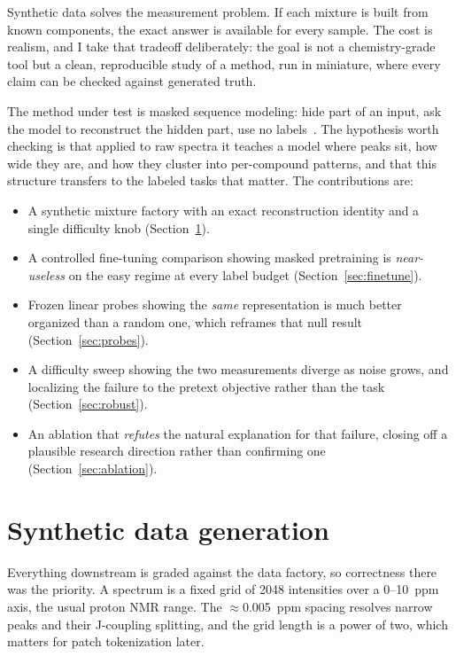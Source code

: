 \documentclass[11pt]{article}
\begin{document}
Synthetic data solves the measurement problem. If each mixture is built from known components,
the exact answer is available for every sample. The cost is realism, and I take that tradeoff
deliberately: the goal is not a chemistry-grade tool but a clean, reproducible study of a
method, run in miniature, where every claim can be checked against generated truth.

The method under test is masked sequence modeling: hide part of an input, ask the model to
reconstruct the hidden part, use no labels~\cite{bert,mae}. The hypothesis worth checking is
that applied to raw spectra it teaches a model where peaks sit, how wide they are, and how
they cluster into per-compound patterns, and that this structure transfers to the labeled
tasks that matter. The contributions are:

\begin{itemize}
  \item A synthetic mixture factory with an exact reconstruction identity and a single
        difficulty knob (Section~\ref{sec:data}).
  \item A controlled fine-tuning comparison showing masked pretraining is \emph{near-useless}
        on the easy regime at every label budget (Section~\ref{sec:finetune}).
  \item Frozen linear probes showing the \emph{same} representation is much better organized
        than a random one, which reframes that null result (Section~\ref{sec:probes}).
  \item A difficulty sweep showing the two measurements diverge as noise grows, and localizing
        the failure to the pretext objective rather than the task (Section~\ref{sec:robust}).
  \item An ablation that \emph{refutes} the natural explanation for that failure, closing off a
        plausible research direction rather than confirming one (Section~\ref{sec:ablation}).
\end{itemize}

\section{Synthetic data generation}
\label{sec:data}

Everything downstream is graded against the data factory, so correctness there was the
priority. A spectrum is a fixed grid of 2048 intensities over a 0--10~ppm axis, the usual
proton NMR range. The $\approx$0.005~ppm spacing resolves narrow peaks and their J-coupling
splitting, and the grid length is a power of two, which matters for patch tokenization later.
\end{document}
